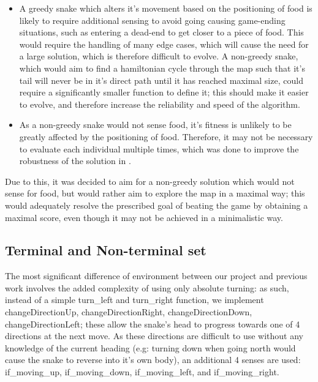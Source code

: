 \documentclass[british,10pt,a4paper]{article}
\begin{document}
\begin{itemize}
	\item A greedy snake which alters it's movement based on the positioning of food is likely to require additional sensing to avoid going causing game-ending situations, such as entering a dead-end to get closer to a piece of food. This would require the handling of many edge cases, which will cause the need for a large solution, which is therefore difficult to evolve. A non-greedy snake, which would aim to find a hamiltonian cycle through the map such that it's tail will never be in it's direct path until it has reached maximal size, could require a significantly smaller function to define it; this should make it easier to evolve, and therefore increase the reliability and speed of the algorithm.
	\item As a non-greedy snake would not sense food, it's fitness is unlikely to be greatly affected by the positioning of food. Therefore, it may not be necessary to evaluate each individual multiple times, which was done to improve the robustness of the solution in \cite{Ehlis2000-sz}.
\end{itemize}
Due to this, it was decided to aim for a non-greedy solution which would not sense for food, but would rather aim to explore the map in a maximal way; this would adequately resolve the prescribed goal of beating the game by obtaining a maximal score, even though it may not be achieved in a minimalistic way.

\subsection{Terminal and Non-terminal set}
\label{subsec:design_terminals}
The most significant difference of environment between our project and previous work involves the added complexity of using only absolute turning: as such, instead of a simple turn\_left and turn\_right function, we implement changeDirectionUp, changeDirectionRight, changeDirectionDown, changeDirectionLeft; these allow the snake's head to progress towards one of 4 directions at the next move. As these directions are difficult to use without any knowledge of the current heading (e.g: turning down when going north would cause the snake to reverse into it's own body), an additional 4 senses are used: if\_moving\_up, if\_moving\_down, if\_moving\_left, and if\_moving\_right. \newline
\end{document}

